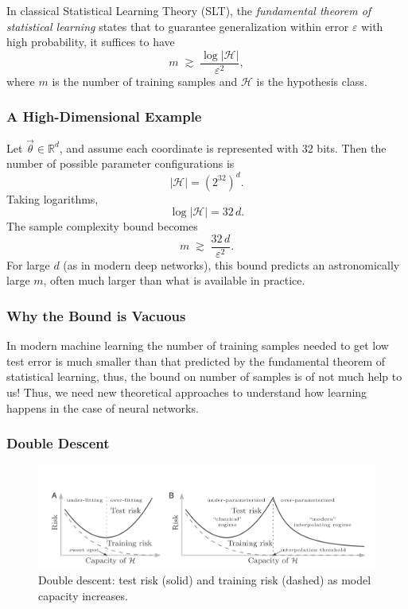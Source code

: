 \documentclass[11pt]{article}
\theoremstyle{plain}
\begin{document}
In classical Statistical Learning Theory (SLT), the \textit{fundamental theorem of statistical learning} states that to guarantee generalization within error $\varepsilon$ with high probability, it suffices to have
\[
m \;\gtrsim\; \frac{\log |\mathcal{H}|}{\varepsilon^2},
\]
where $m$ is the number of training samples and $\mathcal{H}$ is the hypothesis class.

\subsubsection*{A High-Dimensional Example}
Let $\vec{\theta} \in \mathbb{R}^d$, and assume each coordinate is represented with $32$ bits. Then the number of possible parameter configurations is
\[
|\mathcal{H}| = \left( 2^{32} \right)^{d}.
\]
Taking logarithms,
\[
\log |\mathcal{H}| = 32\,d.
\]
The sample complexity bound becomes
\[
m \;\gtrsim\; \frac{32\,d}{\varepsilon^2}.
\]
For large $d$ (as in modern deep networks), this bound predicts an astronomically large $m$, often much larger than what is available in practice.

\subsubsection*{Why the Bound is Vacuous}
In modern machine learning the number of training samples needed to get low test error is much smaller than that predicted by the fundamental theorem of statistical learning, thus, the bound on number of samples is of not much help to us! Thus, we need new theoretical approaches to understand how learning happens in the case of neural networks.

\subsubsection{Double Descent}

\begin{figure}[ht]
  \centering
  \includegraphics[width=\linewidth]{DoubleDescent.png}
  \caption{Double descent: test risk (solid) and training risk (dashed) as model capacity increases.}
  \label{fig:double-descent}
\end{figure}
\end{document}
